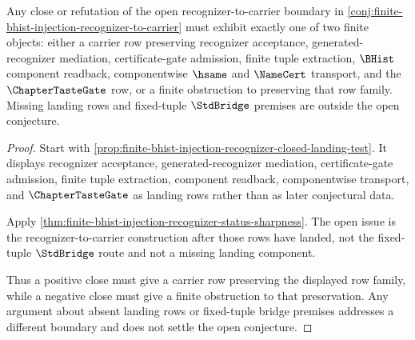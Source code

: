 \begin{theorem}
\label{thm:finite-bhist-injection-carrier-map-obstruction-witness}
Any close or refutation of the open recognizer-to-carrier boundary in \autoref{conj:finite-bhist-injection-recognizer-to-carrier} must exhibit exactly one of two finite objects: either a carrier row preserving recognizer acceptance, generated-recognizer mediation, certificate-gate admission, finite tuple extraction, $\BHist$ component readback, componentwise $\hsame$ and $\NameCert$ transport, and the $\ChapterTasteGate$ row, or a finite obstruction to preserving that row family. Missing landing rows and fixed-tuple $\StdBridge$ premises are outside the open conjecture.
\end{theorem}
\begin{proof}
Start with \autoref{prop:finite-bhist-injection-recognizer-closed-landing-test}. It displays recognizer acceptance, generated-recognizer mediation, certificate-gate admission, finite tuple extraction, component readback, componentwise transport, and $\ChapterTasteGate$ as landing rows rather than as later conjectural data.

Apply \autoref{thm:finite-bhist-injection-recognizer-status-sharpness}. The open issue is the recognizer-to-carrier construction after those rows have landed, not the fixed-tuple $\StdBridge$ route and not a missing landing component.

Thus a positive close must give a carrier row preserving the displayed row family, while a negative close must give a finite obstruction to that preservation. Any argument about absent landing rows or fixed-tuple bridge premises addresses a different boundary and does not settle the open conjecture.
\end{proof}

